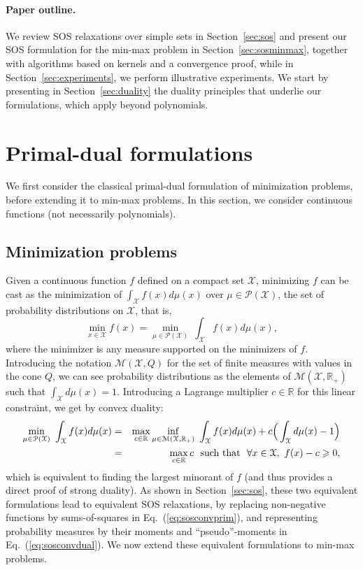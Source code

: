 \documentclass[11pt]{article}
\newcommand{\BEA}{\begin{eqnarray}}
\newcommand{\EEA}{\end{eqnarray}}
\newcommand{\BEQ}{\begin{equation}}
\newcommand{\EEQ}{\end{equation}}
\newcommand{\rb}{\mathbb{R}}
\newcommand{\mysec}[1]{Section~\ref{sec:#1}}
\newcommand{\eq}[1]{Eq.~(\ref{eq:#1})}
\def \X{{\mathcal X}}
\begin{document}
\paragraph{Paper outline.}
We review SOS relaxations over simple sets in \mysec{sos} and present our SOS formulation for the min-max problem in \mysec{sosminmax}, together with algorithms based on kernels and a convergence proof, while in \mysec{experiments}, we perform illustrative experiments. We start by presenting in \mysec{duality} the duality principles that underlie our formulations, which apply beyond polynomials.




\section{Primal-dual formulations}
We first consider the classical primal-dual formulation of minimization problems, before extending it to min-max problems.
In this section, we consider continuous functions (not necessarily polynomials).

\label{sec:duality}

\subsection{Minimization problems}
\label{sec:dumin}
Given a continuous function $f$ defined on a compact set $\X$, minimizing $f$ can be cast as the minimization of 
$\int_\X f(x) d\mu(x)$ over $\mu \in \mathcal{P}(\X)$, the set of probability distributions on $\X$, that is,
\BEQ
\label{eq:sosconvdual}
\min_{x \in \X} f(x) = \min_{\mu \in \mathcal{P}(\X)} \ \int_\X f(x) d\mu(x),
\EEQ
where the minimizer is any measure supported on the minimizers of $f$.
Introducing the notation $\mathcal{M}(\X, Q)$ for the set of finite measures with values in the cone $Q$, we can see probability distributions as the elements of $\mathcal{M}(\X, \rb_+)$ such that $\int_\X d\mu(x) = 1$. Introducing a Lagrange multiplier $c \in \rb$ for this linear constraint, we get by convex duality:
\BEA
\notag \min_{\mu \in \mathcal{P}(\X)} \ \int_\X f(x) d\mu(x)
& = & \max_{c \in \rb} 
\inf_{\mu \in \mathcal{M}(\X, \rb_+)}\ \int_\X f(x) d\mu(x) + c \Big( \int_\X d\mu(x) - 1 \Big)
\\
\label{eq:sosconvprim}& = & \max_{c \in \rb} c\ \mbox{ such that } \ \forall x \in \X, \ f(x) -c \geqslant 0,
\EEA
which is equivalent to finding the largest minorant of $f$ (and thus provides a direct proof of strong duality). As shown in \mysec{sos}, these two equivalent formulations lead to equivalent SOS relaxations, by replacing non-negative functions by sums-of-squares in \eq{sosconvprim}, and representing probability measures by their moments and ``pseudo''-moments in \eq{sosconvdual}. We now extend these equivalent formulations to min-max problems.
\end{document}
